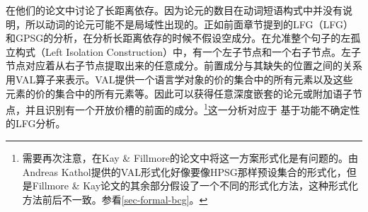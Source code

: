 \mbox{} \citet[\S~3.10]{KF99a}在他们的论文中讨论了长距离依存。因为论元的数目在动词短语构式中并没有说明，所以动词的论元可能不是局域性出现的。正如前面章节提到的LFG\indexlfgc（LFG）和GPSG的分析\indexgpsgc，在分析长距离依存的时候不假设空成分。在允准整个句子的左孤立构式（Left Isolation Construction）中，有一个左子节点和一个右子节点。左子节点对应着从右子节点提取出来的任意成分。前置成分与其缺失的位置之间的关系用VAL算子来表示。VAL提供一个语言学对象的价的集合中的所有元素以及这些元素的价的集合中的所有元素等。因此可以获得任意深度嵌套的论元或附加语子节点，并且识别有一个开放价槽的前面的成分。\footnote{%
   需要再次注意，在Kay \& Fillmore的论文中将这一方案形式化是有问题的。由Andreas Kathol提供的VAL形式化好像要像HPSG那样预设集合的形式化，但是Fillmore \& Kay论文的其余部分假设了一个不同的形式化方法，这种形式化方法前后不一致。参看\ref{sec-formal-bcg}。
 }这一分析对应于 \citet{KZ89a}基于功能不确定性的LFG分析。%

